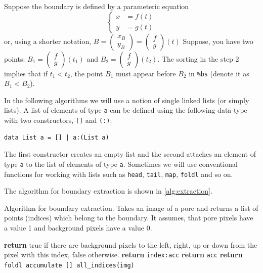 \documentclass[reprint,amsmath,amssymb,aps,pre,showkeys,showpacs]{revtex4-1}
\begin{document}
Suppose the boundary is defined by a parameteric equation
\begin{equation*}
  \left\{
  \begin{aligned}
    x &= f(t) \\
    y &= g(t)
  \end{aligned}
  \right.
\end{equation*}
or, using a shorter notation,
$B = \begin{pmatrix} x_B \\ y_B \end{pmatrix} = \begin{pmatrix} f \\ g \end{pmatrix}(t)$
Suppose, you have two points: $B_1 = \begin{pmatrix} f \\ g \end{pmatrix}(t_1)$
and $B_2 = \begin{pmatrix} f \\ g \end{pmatrix}(t_2)$. The sorting in the step 2
implies that if $t_1 < t_2$, the point $B_1$ must appear before $B_2$ in
\texttt{\%bs} (denote it as $B_1 < B_2$).

In the following algorithms we will use a notion of single linked lists (or
simply lists). A list of elements of type \texttt{a} can be defined using the
following data type with two constructors, \texttt{[]} and \texttt{(:)}:
\begin{verbatim}
data List a = [] | a:(List a)
\end{verbatim}
The first constructor creates an empty list and the second attaches an element
of type \texttt{a} to the list of elements of type \texttt{a}. Sometimes we will
use conventional functions for working with lists such as \texttt{head},
\texttt{tail}, \texttt{map}, \texttt{foldl} and so on.

The algorithm for boundary extraction is shown in \cref{alg:extraction}.
\begin{algorithm}[H]
  \caption{Algorithm for boundary extraction. Takes an image of a pore and
    returns a list of points (indices) which belong to the boundary. It assumes,
  that pore pixels have a value 1 and background pixels have a value 0.}
  \label{alg:extraction}
  \begin{algorithmic}[1]
    \State \textbf{return} true if there are background pixels to the left,
    right, up or down from the pixel with this index, false otherwise.
    \EndProcedure
    \State \textbf{return} \texttt{index:acc}
    \Else
    \State \textbf{return} \texttt{acc}
    \EndIf
    \EndProcedure
    \State \textbf{return} \texttt{foldl accumulate [] all\_indices(img)}
    \EndProcedure
  \end{algorithmic}
\end{algorithm}
\end{document}
